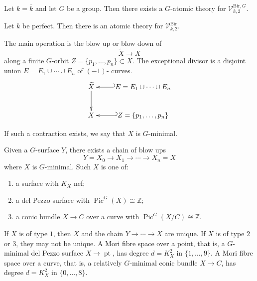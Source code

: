 \begin{theorem}
\label{theorem-let-k}
Let $k=\overline k$ and let $G$ be a
group.
Then there exists a $G$-atomic theory
for $\mathcal V_{k,2}^{\mathrm{Bir},G}$.
\end{theorem}

\begin{remark}
\label{remark-let-k}
Let $k$ be perfect.
Then there is an atomic theory for
$\mathcal V_{k,2}^{\mathrm{Bir}}$.
\end{remark}

\medskip\noindent
The main operation is the blow up or
blow down of
\[
\widetilde X \to X
\]
along a finite $G$-orbit
$Z=\{p_1,\dots,p_n\}\subset X$.
The exceptional divisor is a
disjoint union
$E=E_1\cup\cdots\cup E_n$ of $(-1)$-
curves.
\[
\xymatrix{
\widetilde X \ar[d] & E=
E_1\cup\cdots\cup E_n
\ar@{_{(}->}[l] \\
X & Z=\{p_1,\dots,p_n\}
\ar@{_{(}->}[l]
}
\]

\begin{definition}
\label{definition-such-contraction}
If such a contraction exists, we say
that $X$ is $G$-minimal.
\end{definition}

\begin{theorem}
\label{theorem-given-g}
Given a $G$-surface $Y$, there exists
a chain of blow ups
\[
Y=X_0\to X_1\to\cdots\to X_n=X
\]
where $X$ is $G$-minimal.
Such $X$ is one of:
\begin{enumerate}
\item a surface with $K_X$ nef;
\item a del Pezzo surface with
$\operatorname{Pic}^G(X)\cong\mathbb Z$;
\item a conic bundle
$X\to C$ over a curve with
$\operatorname{Pic}^G(X/C)\cong\mathbb Z$.
\end{enumerate}
\end{theorem}

\begin{remark}
\label{remark-x-type}
If $X$ is of type $1$, then $X$ and
the chain $Y\to\cdots\to X$ are
unique.
If $X$ is of type $2$ or $3$, they may
not be unique.
\medskip\noindent
A Mori fibre space over a point, that
is, a $G$-minimal del Pezzo surface
$X\to \operatorname{pt}$, has degree
$d=K_X^2$ in $\{1,\dots,9\}$.
A Mori fibre space over a curve,
that is, a relatively $G$-minimal
conic bundle $X\to C$, has degree
$d=K_X^2$ in $\{0,\dots,8\}$.
\end{remark}

